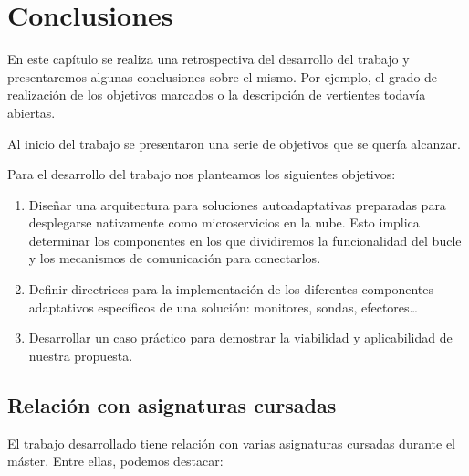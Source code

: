 \chapter{Conclusiones}
\label{chap:conclusiones}

En este capítulo se realiza una retrospectiva del desarrollo del trabajo y presentaremos algunas conclusiones sobre el mismo. Por ejemplo, el grado de realización de los objetivos marcados o la descripción de vertientes todavía abiertas.

Al inicio del trabajo se presentaron una serie de objetivos que se quería alcanzar.


Para el desarrollo del trabajo nos planteamos los siguientes objetivos:

\begin{enumerate}
  \item Diseñar una arquitectura para soluciones autoadaptativas preparadas para desplegarse nativamente como microservicios en la nube. Esto implica determinar los componentes en los que dividiremos la funcionalidad del bucle y los mecanismos de comunicación para conectarlos.

  \item Definir directrices para la implementación de los diferentes componentes adaptativos específicos de una solución: monitores, sondas, efectores\dots

  \item Desarrollar un caso práctico para demostrar la viabilidad y aplicabilidad de nuestra propuesta.
\end{enumerate}

\section{Relación con asignaturas cursadas}

El trabajo desarrollado tiene relación con varias asignaturas cursadas durante el máster. Entre ellas, podemos destacar:

